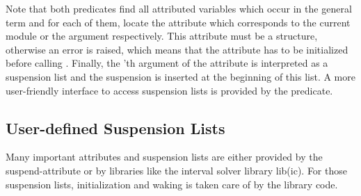 Note that both predicates
find all attributed variables which occur in the general term  and
for
each of them,
locate the attribute which corresponds to the current module or the
 argument respectively.
This attribute must be a structure, otherwise an error
is raised, which means that the attribute has to be initialized
before calling
.%
Finally, the 'th argument of the attribute
is interpreted as a suspension list and the suspension
 is inserted at the beginning of this list.
A more user-friendly interface to access suspension lists is
provided by the
predicate.


\subsection{User-defined Suspension Lists}

Many important attributes and suspension lists are either provided by
the suspend-attribute or by libraries like the interval solver library lib(ic).
For those suspension lists, initialization and waking is taken care of
by the library code.

